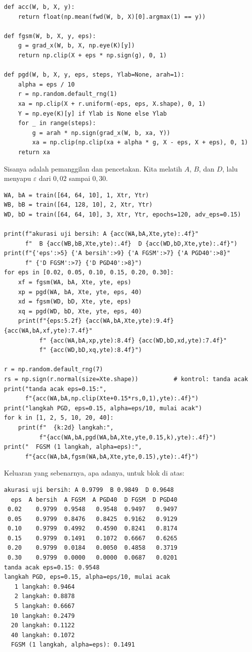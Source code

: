\begin{lab}
\begin{verbatim}
def acc(W, b, X, y):
    return float(np.mean(fwd(W, b, X)[0].argmax(1) == y))

def fgsm(W, b, X, y, eps):
    g = grad_x(W, b, X, np.eye(K)[y])
    return np.clip(X + eps * np.sign(g), 0, 1)

def pgd(W, b, X, y, eps, steps, Ylab=None, arah=1):
    alpha = eps / 10
    r = np.random.default_rng(1)
    xa = np.clip(X + r.uniform(-eps, eps, X.shape), 0, 1)
    Y = np.eye(K)[y] if Ylab is None else Ylab
    for _ in range(steps):
        g = arah * np.sign(grad_x(W, b, xa, Y))
        xa = np.clip(np.clip(xa + alpha * g, X - eps, X + eps), 0, 1)
    return xa
\end{verbatim}
\end{lab}

Sisanya adalah pemanggilan dan pencetakan. Kita melatih $A$, $B$, dan $D$, lalu
menyapu $\varepsilon$ dari $0{,}02$ sampai $0{,}30$.

\begin{verbatim}
WA, bA = train([64, 64, 10], 1, Xtr, Ytr)
WB, bB = train([64, 128, 10], 2, Xtr, Ytr)
WD, bD = train([64, 64, 10], 3, Xtr, Ytr, epochs=120, adv_eps=0.15)

print(f"akurasi uji bersih: A {acc(WA,bA,Xte,yte):.4f}"
      f"  B {acc(WB,bB,Xte,yte):.4f}  D {acc(WD,bD,Xte,yte):.4f}")
print(f"{'eps':>5} {'A bersih':>9} {'A FGSM':>7} {'A PGD40':>8}"
      f" {'D FGSM':>7} {'D PGD40':>8}")
for eps in [0.02, 0.05, 0.10, 0.15, 0.20, 0.30]:
    xf = fgsm(WA, bA, Xte, yte, eps)
    xp = pgd(WA, bA, Xte, yte, eps, 40)
    xd = fgsm(WD, bD, Xte, yte, eps)
    xq = pgd(WD, bD, Xte, yte, eps, 40)
    print(f"{eps:5.2f} {acc(WA,bA,Xte,yte):9.4f} {acc(WA,bA,xf,yte):7.4f}"
          f" {acc(WA,bA,xp,yte):8.4f} {acc(WD,bD,xd,yte):7.4f}"
          f" {acc(WD,bD,xq,yte):8.4f}")

r = np.random.default_rng(7)
rs = np.sign(r.normal(size=Xte.shape))          # kontrol: tanda acak
print("tanda acak eps=0.15:",
      f"{acc(WA,bA,np.clip(Xte+0.15*rs,0,1),yte):.4f}")
print("langkah PGD, eps=0.15, alpha=eps/10, mulai acak")
for k in [1, 2, 5, 10, 20, 40]:
    print(f"  {k:2d} langkah:",
          f"{acc(WA,bA,pgd(WA,bA,Xte,yte,0.15,k),yte):.4f}")
print("  FGSM (1 langkah, alpha=eps):",
      f"{acc(WA,bA,fgsm(WA,bA,Xte,yte,0.15),yte):.4f}")
\end{verbatim}

Keluaran yang sebenarnya, apa adanya, untuk blok di atas:

\begin{verbatim}
akurasi uji bersih: A 0.9799  B 0.9849  D 0.9648
  eps  A bersih  A FGSM  A PGD40  D FGSM  D PGD40
 0.02    0.9799  0.9548   0.9548  0.9497   0.9497
 0.05    0.9799  0.8476   0.8425  0.9162   0.9129
 0.10    0.9799  0.4992   0.4590  0.8241   0.8174
 0.15    0.9799  0.1491   0.1072  0.6667   0.6265
 0.20    0.9799  0.0184   0.0050  0.4858   0.3719
 0.30    0.9799  0.0000   0.0000  0.0687   0.0201
tanda acak eps=0.15: 0.9548
langkah PGD, eps=0.15, alpha=eps/10, mulai acak
   1 langkah: 0.9464
   2 langkah: 0.8878
   5 langkah: 0.6667
  10 langkah: 0.2479
  20 langkah: 0.1122
  40 langkah: 0.1072
  FGSM (1 langkah, alpha=eps): 0.1491
\end{verbatim}

